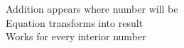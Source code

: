 \documentclass[preview]{standalone}
\begin{document}
Addition appears where number will be\\Equation transforms into result\\Works for every interior number\\
\end{document}
